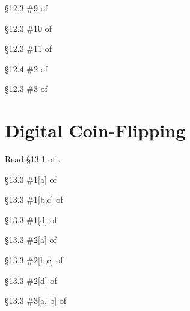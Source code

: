\begin{problem}[15 points]
	\S 12.3 \#9 of \cite {tw}
\end{problem}

\begin{problem}[15 points]
	\S 12.3 \#10 of \cite {tw}
\end{problem}

\begin{problem}[10 points]
	\S 12.3 \#11 of \cite {tw}
\end{problem}

\begin{problem}[10 points]
	\S 12.4 \#2 of \cite {tw}
\end{problem}

\begin{problem}[10 points]
	\S 12.3 \#3 of \cite {tw}
\end{problem}

	\section{Digital Coin-Flipping}

Read \S 13.1 of \cite{tw}.

\begin{problem}[10 points]
	\S 13.3 \#1[a] of \cite {tw}
\end{problem}

\begin{problem}[10 points]
	\S 13.3 \#1[b,c] of \cite {tw}
\end{problem}

\begin{problem}[10 points]
	\S 13.3 \#1[d] of \cite {tw}
\end{problem}

\begin{problem}[10 points]
	\S 13.3 \#2[a] of \cite {tw}
\end{problem}

\begin{problem}[15 points]
	\S 13.3 \#2[b,c] of \cite {tw}
\end{problem}

\begin{problem}[10 points]
	\S 13.3 \#2[d] of \cite {tw}
\end{problem}

\begin{problem}[15 points]
	\S 13.3 \#3[a, b] of \cite {tw}
\end{problem}

